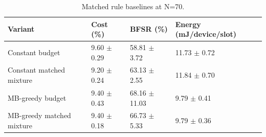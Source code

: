 \begin{table}[t]
\centering
\caption{Matched rule baselines at N=70.}
\label{tab:fair_rules}
\begin{tabular}{llll}
\toprule
Variant & Cost (\%) & BFSR (\%) & Energy (mJ/device/slot) \\
\midrule
Constant budget & 9.60 $\pm$ 0.29 & 58.81 $\pm$ 3.72 & 11.73 $\pm$ 0.72 \\
Constant matched mixture & 9.20 $\pm$ 0.24 & 63.13 $\pm$ 2.55 & 11.84 $\pm$ 0.70 \\
MB-greedy budget & 9.40 $\pm$ 0.43 & 68.16 $\pm$ 11.03 & 9.79 $\pm$ 0.41 \\
MB-greedy matched mixture & 9.40 $\pm$ 0.18 & 66.73 $\pm$ 5.33 & 9.79 $\pm$ 0.36 \\
\bottomrule
\end{tabular}
\end{table}
